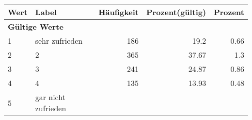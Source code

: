      \begin{longtable}{lXrrr}
     \toprule
     \textbf{Wert} & \textbf{Label} & \textbf{Häufigkeit} & \textbf{Prozent(gültig)} & \textbf{Prozent} \\
     \endhead
     \midrule
     \multicolumn{5}{l}{\textbf{Gültige Werte}}\\

     1 &
     \multicolumn{1}{X}{ sehr zufrieden   } &


       \num{186} &
       \num[round-mode=places,round-precision=2]{19,2} &
         \num[round-mode=places,round-precision=2]{0,66} \\

     2 &
     \multicolumn{1}{X}{ 2   } &


       \num{365} &
       \num[round-mode=places,round-precision=2]{37,67} &
         \num[round-mode=places,round-precision=2]{1,3} \\

     3 &
     \multicolumn{1}{X}{ 3   } &


       \num{241} &
       \num[round-mode=places,round-precision=2]{24,87} &
         \num[round-mode=places,round-precision=2]{0,86} \\

     4 &
     \multicolumn{1}{X}{ 4   } &


       \num{135} &
       \num[round-mode=places,round-precision=2]{13,93} &
         \num[round-mode=places,round-precision=2]{0,48} \\

     5 &
     \multicolumn{1}{X}{ gar nicht zufrieden   } &



\end{longtable}
